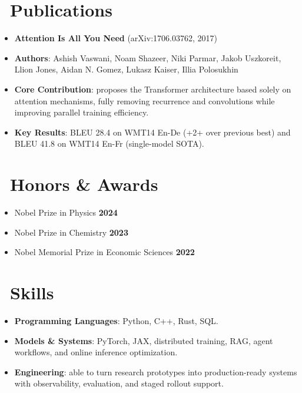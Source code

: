 \documentclass{resume}
\begin{document}
\section{\faBook\ Publications}
\begin{itemize}
    \item \textbf{Attention Is All You Need} (arXiv:1706.03762, 2017)
    \item \textbf{Authors}: Ashish Vaswani, Noam Shazeer, Niki Parmar, Jakob Uszkoreit, Llion Jones, Aidan N. Gomez, Lukasz Kaiser, Illia Polosukhin
    \item \textbf{Core Contribution}: proposes the Transformer architecture based solely on attention mechanisms, fully removing recurrence and convolutions while improving parallel training efficiency.
    \item \textbf{Key Results}: BLEU 28.4 on WMT14 En-De (+2+ over previous best) and BLEU 41.8 on WMT14 En-Fr (single-model SOTA).
\end{itemize}

\section{\faTrophy\ Honors \& Awards}
\begin{itemize}
    \item Nobel Prize in Physics \hfill \textbf{2024}
    \item Nobel Prize in Chemistry \hfill \textbf{2023}
    \item Nobel Memorial Prize in Economic Sciences \hfill \textbf{2022}
\end{itemize}

\section{\faCogs\ Skills}
\begin{itemize}[parsep=0.2ex]
    \item \textbf{Programming Languages}: Python, C++, Rust, SQL.
    \item \textbf{Models \& Systems}: PyTorch, JAX, distributed training, RAG, agent workflows, and online inference optimization.
    \item \textbf{Engineering}: able to turn research prototypes into production-ready systems with observability, evaluation, and staged rollout support.
\end{itemize}
\end{document}
